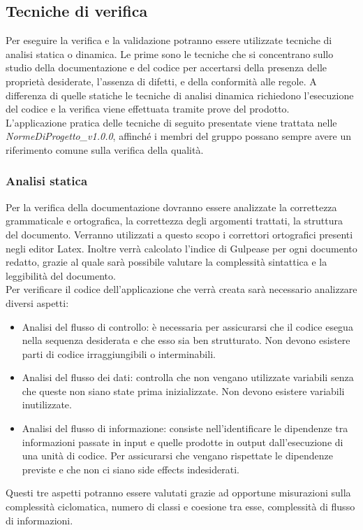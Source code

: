 \subsection{Tecniche di verifica}
Per eseguire la verifica e la validazione potranno essere utilizzate tecniche di analisi statica o dinamica. Le prime sono le tecniche che si concentrano sullo studio della documentazione e del codice per accertarsi della presenza delle proprietà desiderate, l'assenza di difetti, e della conformità alle regole. A differenza di quelle statiche le tecniche di analisi dinamica richiedono l'esecuzione del codice e la verifica viene effettuata tramite prove del prodotto.\\
L'applicazione pratica delle tecniche di seguito presentate viene trattata nelle \textit{NormeDiProgetto\_v1.0.0}, affinché i membri del gruppo possano sempre avere un riferimento comune sulla verifica della qualità.
\subsubsection{Analisi statica}
Per la verifica della documentazione dovranno essere analizzate la correttezza grammaticale e ortografica, la correttezza degli argomenti trattati, la struttura del documento. Verranno utilizzati a questo scopo i correttori ortografici presenti negli editor Latex. Inoltre verrà calcolato l'indice di Gulpease per ogni documento redatto, grazie al quale sarà possibile valutare la complessità sintattica e la leggibilità del documento.\\
Per verificare il codice dell'applicazione che verrà creata sarà necessario analizzare diversi aspetti:
\begin{itemize}
\item Analisi del flusso di controllo: è necessaria per assicurarsi che il codice esegua nella sequenza desiderata e che esso sia ben strutturato. Non devono esistere parti di codice irraggiungibili o interminabili.
\item Analisi del flusso dei dati: controlla che non vengano utilizzate variabili senza che queste non siano state prima inizializzate. Non devono esistere variabili inutilizzate. 
\item Analisi del flusso di informazione: consiste nell'identificare le dipendenze tra informazioni passate in input e quelle prodotte in output dall’esecuzione di una unità di codice. Per assicurarsi che vengano rispettate le dipendenze previste e che non ci siano side effects indesiderati.
\end{itemize}
Questi tre aspetti potranno essere valutati grazie ad opportune misurazioni sulla complessità ciclomatica, numero di classi e coesione tra esse, complessità di flusso di informazioni.
\newpage
